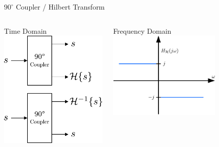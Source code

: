 \documentclass[10pt]{beamer}
\begin{document}
\begin{frame}{$90^\circ$ Coupler / Hilbert Transform}
  \begin{columns}[T]
    \begin{column}{.5\textwidth}
      \begin{block}{Time Domain}
        \includegraphics[width=\textwidth]{figures/90deg_coupler_hilbert}
      \end{block}
    \end{column}
    \begin{column}{.5\textwidth}
      \begin{block}{Frequency Domain}
        \centering
        \includegraphics[width=0.7\textwidth]{figures/hilbert}

\end{block}
\end{column}
\end{columns}
\end{frame}
\end{document}
